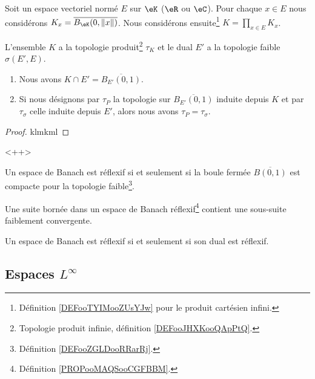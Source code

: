 \begin{proposition}	\label{PROPooJAHDooZleVfJ}
	Soit un espace vectoriel normé \( E\) sur \( \eK\) (\( \eR\) ou \( \eC\)). Pour chaque \( x\in E\) nous considérons \(K_x=\overline{B_{\eK}(0,\| x \|)}\). Nous considérons ensuite\footnote{Définition \ref{DEFooTYIMooZUsYJw} pour le produit cartésien infini.} \( K=\prod_{x\in E}K_x\).

	L'ensemble \( K\) a la topologie produit\footnote{Topologie produit infinie, définition \ref{DEFooJHXKooQApPtQ}.} \( \tau_K\) et le dual \( E'\) a la topologie faible \( \sigma(E',E)\).

	\begin{enumerate}
		\item
		      Nous avons \( K\cap E'=\overline{B_{E'}(0,1)}\).
		\item
		      Si nous désignons par \( \tau_P\) la topologie sur \( \overline{B_{E'}(0,1)}\) induite depuis \( K\) et par \( \tau_{\sigma}\) celle induite depuis \( E'\), alors nous avons \( \tau_P=\tau_{\sigma}\).
	\end{enumerate}
\end{proposition}

\begin{proof}
	klmkml
\end{proof}<++>


\begin{theorem}       \label{THOooTFIHooPQjVAr}
	Un espace de Banach est réflexif si et seulement si la boule fermée \( \overline{ B(0,1) }\) est compacte pour la topologie faible\footnote{Définition \ref{DEFooZGLDooRRarRj}.}.
\end{theorem}

\begin{proposition}       \label{PROPooPVVYooMZjQSq}
	Une suite bornée dans un espace de Banach réflexif\footnote{Définition \ref{PROPooMAQSooCGFBBM}.} contient une sous-suite faiblement convergente.
\end{proposition}

\begin{proposition}       \label{PROPooBBNBooGcXDRH}
	Un espace de Banach est réflexif si et seulement si son dual est réflexif.
\end{proposition}

\subsection{Espaces \texorpdfstring{\(  L^{\infty}\)}{Linfinity}}

